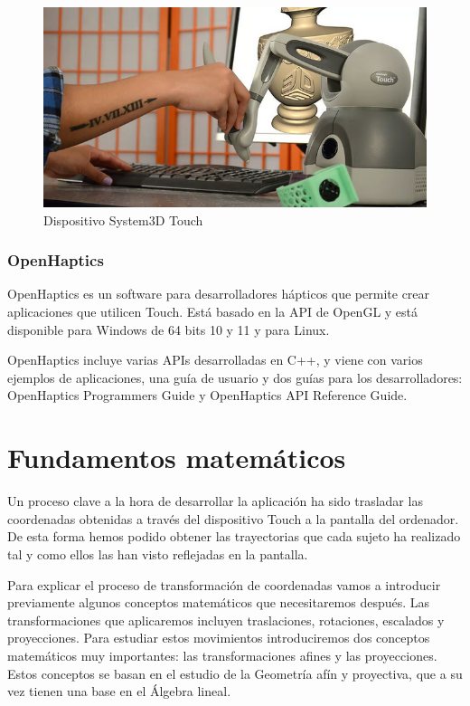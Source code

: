 \documentclass[a4paper,11pt, oneside]{book}
\begin{document}
\begin{figure}[H]
	
	\centering
	\includegraphics[width=\linewidth]{touch}
	\caption{Dispositivo System3D Touch}
	\label{fig:figura1}
	
\end{figure}

\subsection{OpenHaptics}

OpenHaptics es un software para desarrolladores hápticos que permite crear aplicaciones que utilicen Touch. Está basado en la API de OpenGL y está disponible para Windows de 64 bits 10 y 11 y para Linux. 

OpenHaptics incluye varias APIs desarrolladas en C++, y viene con varios ejemplos de aplicaciones, una guía de usuario y dos guías para los desarrolladores: OpenHaptics Programmers Guide y OpenHaptics API Reference Guide. 




\chapter{Fundamentos matemáticos}

Un proceso clave a la hora de desarrollar la aplicación ha sido trasladar las coordenadas obtenidas a través del dispositivo Touch a la pantalla del ordenador. De esta forma hemos podido obtener las trayectorias que cada sujeto ha realizado tal y como ellos las han visto reflejadas en la pantalla. 

Para explicar el proceso de transformación de coordenadas vamos a introducir previamente algunos conceptos matemáticos que necesitaremos después. Las transformaciones que aplicaremos incluyen traslaciones, rotaciones, escalados y proyecciones. Para estudiar estos movimientos introduciremos dos conceptos matemáticos muy importantes: las transformaciones afines y las proyecciones. Estos conceptos se basan en el estudio de la Geometría afín y proyectiva, que a su vez tienen una base en el Álgebra lineal. 
\end{document}
